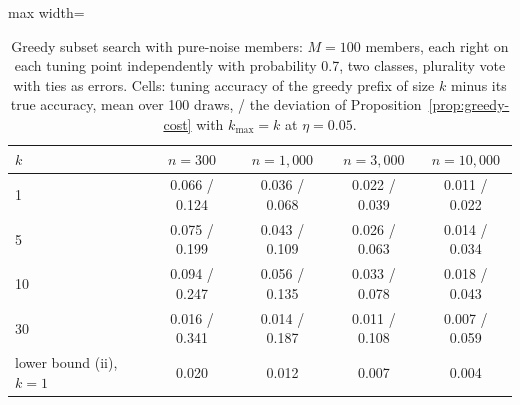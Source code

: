 \begin{table}[t]
\centering
\footnotesize
\caption{Greedy subset search with pure-noise members: $M=100$ members, each right on each tuning point independently with probability 0.7, two classes, plurality vote with ties as errors. Cells: tuning accuracy of the greedy prefix of size $k$ minus its true accuracy, mean over 100 draws, / the deviation of Proposition~\ref{prop:greedy-cost} with $k_{\max}=k$ at $\eta=0.05$.}
\label{tab:purenoise}
\setlength{\tabcolsep}{5pt}\begin{adjustbox}{max width=\linewidth}
\begin{tabular}{lcccc}
\toprule
$k$ & $n=300$ & $n=1{,}000$ & $n=3{,}000$ & $n=10{,}000$ \\
\midrule
1 & 0.066 / 0.124 & 0.036 / 0.068 & 0.022 / 0.039 & 0.011 / 0.022 \\
5 & 0.075 / 0.199 & 0.043 / 0.109 & 0.026 / 0.063 & 0.014 / 0.034 \\
10 & 0.094 / 0.247 & 0.056 / 0.135 & 0.033 / 0.078 & 0.018 / 0.043 \\
30 & 0.016 / 0.341 & 0.014 / 0.187 & 0.011 / 0.108 & 0.007 / 0.059 \\
\midrule
lower bound (ii), $k=1$ & 0.020 & 0.012 & 0.007 & 0.004 \\
\bottomrule
\end{tabular}
\end{adjustbox}
\end{table}
